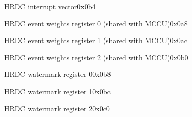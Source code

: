 \begin{register}{H}{RDC interrupt vector}{0x0b4}
	\label{RDC_intrv}
	\regnewline
\end{register}
\begin{register}{H}{RDC event weights register 0 (shared with MCCU)}{0x0a8}
	\label{RDC_weight0}
	\regnewline
\end{register}
\begin{register}{H}{RDC event weights register 1 (shared with MCCU)}{0x0ac}
	\label{RDC_weight1}
	\regnewline
\end{register}
\begin{register}{H}{RDC event weights register 2 (shared with MCCU)}{0x0b0}
	\label{MCCU_weight1}
	\regnewline
\end{register}


\begin{register}{H}{RDC watermark register 0}{0x0b8}
	\label{RDC_water0}
	\regnewline
\end{register}


\begin{register}{H}{RDC watermark register 1}{0x0bc}
	\label{RDC_water1}
	\regnewline
\end{register}

\begin{register}{H}{RDC watermark register 2}{0x0c0}
	\label{RDC_water2}
	\regnewline
\end{register}


